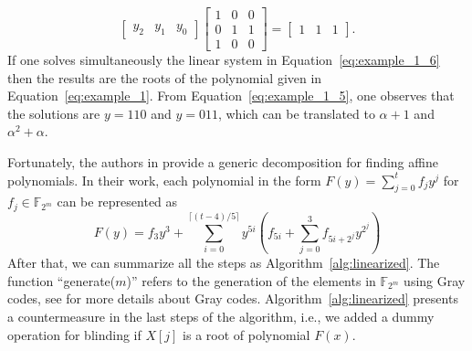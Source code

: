 \begin{example}
\begin{equation}
    \begin{bmatrix} y_2 & y_1 & y_0 \end{bmatrix}
    \begin{bmatrix}
    1 & 0 & 0 \\
    0 & 1 & 1 \\
    1 & 0 & 0
    \end{bmatrix}
    =
    \begin{bmatrix} 1 & 1 & 1 \end{bmatrix}.
\end{equation}
If one solves simultaneously the linear system in Equation~\ref{eq:example_1_6} then the results are the roots of the polynomial given in Equation~\ref{eq:example_1}. From Equation~\ref{eq:example_1_5}, one observes that the solutions are $y=110$ and $y=011$, which can be translated to $\alpha + 1$ and $\alpha^2 + \alpha$.
\end{example}


Fortunately, the authors in \cite{fedorenko2002finding} provide a generic decomposition for finding affine polynomials. In their work, each polynomial in the form $F(y) = \sum_{j=0}^{t} f_jy^j$ for $f_j \in \mathbb{F}_{2^m}$ can be represented as
\begin{equation}
\label{eq:f_y}
    F(y) = f_3y^3 + \sum_{i=0}^{\lceil (t-4)/5 \rceil} y^{5i}(f_{5i} + \sum_{j=0}^{3} f_{5i+2^j}y^{2^j})
\end{equation}
After that, we can summarize all the steps as Algorithm~\ref{alg:linearized}. The function ``generate($m$)'' refers to the generation of the elements in $\mathbb{F}_{2^m}$ using Gray codes, see \cite{savage1997survey} for more details about Gray codes. Algorithm~\ref{alg:linearized} presents a countermeasure in the last steps of the algorithm, i.e., we added a dummy operation for blinding if $X[j]$ is a root of polynomial $F(x)$.

